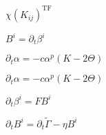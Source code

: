 \documentclass{article}
\begin{document}
$\chi
         (K_{ij})^{\mathrm{TF}}$
\pagebreak

$B^i = \partial_t \beta^i$
\pagebreak

$\partial_t \alpha = - c
  \alpha^p(K-2\Theta)$
\pagebreak

$\partial_t \alpha
  = -c \alpha^p(K-2\Theta)$
\pagebreak

$\partial_t
      \beta^i =  F B^i$
\pagebreak

$\partial_t B^i = \partial_t \tilde
  \Gamma - \eta B^i$
\pagebreak
\end{document}
